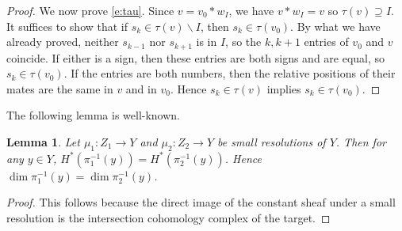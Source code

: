 \documentclass[11pt,letterpaper,reqno]{amsart}
\numberwithin{equation}{section}
\theoremstyle{plain}
\newtheorem{lemma}[theorem]{Lemma}
\theoremstyle{definition}
\theoremstyle{remark}
\begin{document}
\begin{proof}
We now prove \eqref{e:tau}.  Since $v = v_0 * w_I$, we have $v*w_I = v$ so $\tau(v) \supseteq I$. 
It suffices to show that if $s_{k} \in \tau(v) \smallsetminus I$, then $s_{k} \in \tau(v_0)$.
By what we have already proved, neither $s_{k-1}$ nor $s_{k+1}$ is in $I$, so the $k, k+1$ entries
of $v_0$ and $v$ coincide.  If either is a sign, then these entries are both signs and are equal,
so $s_{k} \in \tau(v_0)$.  If the entries are both numbers, then the relative positions of their
mates are the same in $v$ and in $v_0$.  Hence $s_{k} \in \tau(v)$ implies $s_{k} \in \tau(v_0)$.
\end{proof}

The following lemma is well-known.

\begin{lemma} \label{l:fiber-small}
Let $\mu_1: Z_1 \to Y$ and $\mu_2: Z_2 \to Y$ be small resolutions of $Y$.  Then for any $y \in Y$,
$H^*(\pi_1^{-1}(y)) = H^*(\pi_2^{-1}(y))$.  Hence $\dim \pi_1^{-1}(y) = \dim \pi_2^{-1}(y)$.
\end{lemma}

\begin{proof}
This follows because the direct image of the constant
sheaf under a small resolution is the intersection cohomology complex of the target.
\end{proof}
\end{document}
